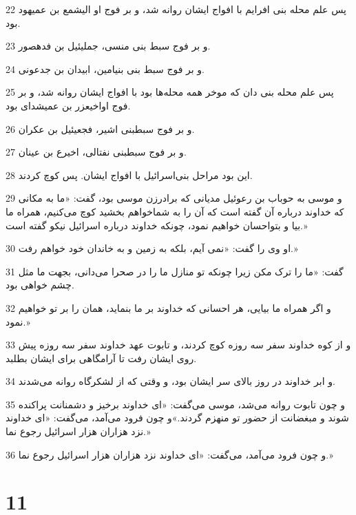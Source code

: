 \par 22 پس علم محله بنی افرایم با افواج ایشان روانه شد، و بر فوج او الیشمع بن عمیهود بود.
\par 23 و بر فوج سبط بنی منسی، جملیئیل بن فدهصور.
\par 24 و بر فوج سبط بنی بنیامین، ابیدان بن جدعونی.
\par 25 پس علم محله بنی دان که موخر همه محله‌ها بود با افواج ایشان روانه شد، و بر فوج اواخیعزر بن عمیشدای بود.
\par 26 و بر فوج سبطبنی اشیر، فجعیئیل بن عکران.
\par 27 و بر فوج سبطبنی نفتالی، اخیرع بن عینان.
\par 28 این بود مراحل بنی‌اسرائیل با افواج ایشان. پس کوچ کردند.
\par 29 و موسی به حوباب بن رعوئیل مدیانی که برادرزن موسی بود، گفت: «ما به مکانی که خداوند درباره آن گفته است که آن را به شماخواهم بخشید کوچ می‌کنیم، همراه ما بیا و بتواحسان خواهیم نمود، چونکه خداوند درباره اسرائیل نیکو گفته است.»
\par 30 او وی را گفت: «نمی آیم، بلکه به زمین و به خاندان خود خواهم رفت.»
\par 31 گفت: «ما را ترک مکن زیرا چونکه تو منازل ما را در صحرا می‌دانی، بجهت ما مثل چشم خواهی بود.
\par 32 و اگر همراه ما بیایی، هر احسانی که خداوند بر ما بنماید، همان را بر تو خواهیم نمود.»
\par 33 و از کوه خداوند سفر سه روزه کوچ کردند، و تابوت عهد خداوند سفر سه روزه پیش روی ایشان رفت تا آرامگاهی برای ایشان بطلبد.
\par 34 و ابر خداوند در روز بالای سر ایشان بود، و وقتی که از لشکرگاه روانه می‌شدند.
\par 35 و چون تابوت روانه می‌شد، موسی می‌گفت: «ای خداوند برخیز و دشمنانت پراکنده شوند و مبغضانت از حضور تو منهزم گردند.»و چون فرود می‌آمد، می‌گفت: «ای خداوند نزد هزاران هزار اسرائیل رجوع نما.»
\par 36 و چون فرود می‌آمد، می‌گفت: «ای خداوند نزد هزاران هزار اسرائیل رجوع نما.»
 
\chapter{11}

